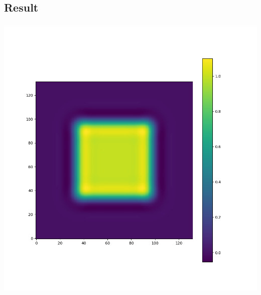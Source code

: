 \documentclass[aspectratio=43, t]{beamer}
\begin{document}
\subsection*{Result}
\begin{frame}
	\frametitle{\subsecname}
	\centering
	\includegraphics[width = \textwidth, height = \textheight, keepaspectratio]{out_field}
	\par
\end{frame}
\end{document}
